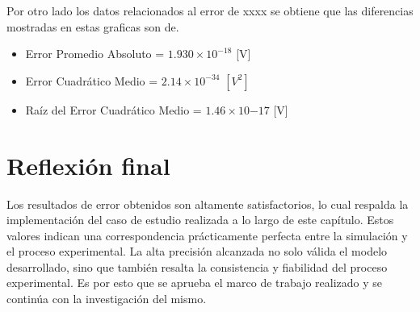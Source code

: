 Por otro lado los datos relacionados al error de xxxx se obtiene que las diferencias mostradas en estas graficas son de.


\begin{itemize}
    \item Error Promedio Absoluto = $1.930 \times 10^{-18}$ [V]
    \item Error Cuadrático Medio = $2.14 \times 10^{-34}$ $[V^{2}]$
    \item Raíz del Error Cuadrático Medio = $1.46 \times 10{-17}$ [V]
\end{itemize}


\section{Reflexión final}

Los resultados de error obtenidos son altamente satisfactorios, lo cual respalda la implementación del caso de estudio realizada a lo largo de este capítulo. Estos valores indican una correspondencia prácticamente perfecta entre la simulación y el proceso experimental. La alta precisión alcanzada no solo válida el modelo desarrollado, sino que también resalta la consistencia y fiabilidad del proceso experimental. Es por esto que se aprueba el marco de trabajo realizado y se continúa con la investigación del mismo.